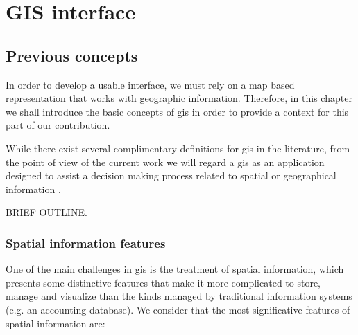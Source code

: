 \part{GIS interface} \label{part:gis}
\chapter{Previous concepts}
\label{ch:gis:prev}
    In order to develop a usable interface, we must rely on a map based representation that works with geographic information. Therefore, in this chapter we shall introduce the basic concepts of \gls{gis} in order to provide a context for this part of our contribution.
    
    While there exist several complimentary definitions for \gls{gis} in the literature, from the point of view of the current work we will regard a \gls{gis} as an application designed to assist a decision making process related to spatial or geographical information \cite{harmon2003design,longley2015geographic}.
    
    BRIEF OUTLINE.
    
    \section{Spatial information features}
    One of the main challenges in \gls{gis} is the treatment of spatial information, which presents some distinctive features that make it more complicated to store, manage and visualize than the kinds managed by traditional information systems (e.g. an accounting database). We consider that the most significative features of spatial information are:
    
